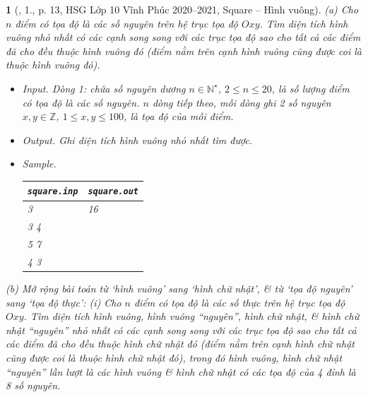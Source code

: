 \documentclass{article}
\newtheorem{baitoan}{}
\begin{document}
\begin{baitoan}[\cite{Trung_HSG_THPT_Tin}, 1., p. 13, HSG Lớp 10 Vĩnh Phúc 2020--2021, Square -- Hình vuông]
	(a) Cho $n$ điểm có tọa độ là các số nguyên trên hệ trục tọa độ $Oxy$. Tìm diện tích hình vuông nhỏ nhất có các cạnh song song với các trục tọa độ sao cho tất cả các điểm đã cho đều thuộc hình vuông đó (điểm nằm trên cạnh hình vuông cũng được coi là thuộc hình vuông đó).
	\begin{itemize}
		\item {\sf Input.} Dòng 1: chứa số nguyên dương $n\in\mathbb{N}^\star$, $2\le n\le20$, là số lượng điểm có tọa độ là các số nguyên. $n$ dòng tiếp theo, mỗi dòng ghi 2 số nguyên $x,y\in\mathbb{Z}$, $1\le x,y\le100$, là tọa độ của mỗi điểm.
		\item {\sf Output.} Ghi diện tích hình vuông nhỏ nhất tìm được.
		\item {\sf Sample.}
		\begin{table}[H]
			\centering
			\begin{tabular}{|l|l|}
				\hline
				{\tt square.inp} & {\tt square.out} \\
				\hline
				3 & 16 \\
				3 4 &  \\
				5 7 &  \\
				4 3 &  \\
				\hline
			\end{tabular}
		\end{table}
	\end{itemize}
	(b) Mở rộng bài toán từ `hình vuông' sang `hình chữ nhật', \& từ `tọa độ nguyên' sang `tọa độ thực': (i) Cho $n$ điểm có tọa độ là các số thực trên hệ trục tọa độ $Oxy$. Tìm diện tích hình vuông, hình vuông ``nguyên'', hình chữ nhật, \& hình chữ nhật ``nguyên'' nhỏ nhất có các cạnh song song với các trục tọa độ sao cho tất cả các điểm đã cho đều thuộc hình chữ nhật đó (điểm nằm trên cạnh hình chữ nhật cũng được coi là thuộc hình chữ nhật đó), trong đó {\rm hình vuông, hình chữ nhật ``nguyên''} lần lượt là các hình vuông \& hình chữ nhật có các tọa độ của 4 đỉnh là 8 số nguyên.
\end{baitoan}
\end{document}
